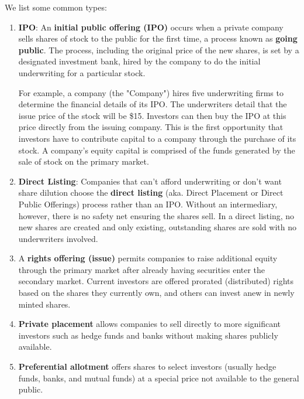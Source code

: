 \documentclass{article}
\begin{document}
    \begin{definition}
    We list some common types:
    \begin{enumerate}
        \item \textbf{IPO}: An \textbf{initial public offering (IPO)} occurs when a private company sells shares of stock to the public for the first time, a process known as \textbf{going public}. The process, including the original price of the new shares, is set by a designated investment bank, hired by the company to do the initial underwriting for a particular stock.

        For example, a company (the "Company") hires five underwriting firms to determine the financial details of its IPO. The underwriters detail that the issue price of the stock will be \$15. Investors can then buy the IPO at this price directly from the issuing company. This is the first opportunity that investors have to contribute capital to a company through the purchase of its stock. A company's equity capital is comprised of the funds generated by the sale of stock on the primary market.
        \item \textbf{Direct Listing}: Companies that can't afford underwriting or don't want share dilution choose the \textbf{direct listing} (aka. Direct Placement or Direct Public Offerings) process rather than an IPO. Without an intermediary, however, there is no safety net ensuring the shares sell. In a direct listing, no new shares are created and only existing, outstanding shares are sold with no underwriters involved. 
        \item A \textbf{rights offering (issue)} permits companies to raise additional equity through the primary market after already having securities enter the secondary market. Current investors are offered prorated (distributed) rights based on the shares they currently own, and others can invest anew in newly minted shares.
        \item \textbf{Private placement} allows companies to sell directly to more significant investors such as hedge funds and banks without making shares publicly available. 
        \item \textbf{Preferential allotment} offers shares to select investors (usually hedge funds, banks, and mutual funds) at a special price not available to the general public. 
    \end{enumerate}
    \end{definition}
\end{document}
